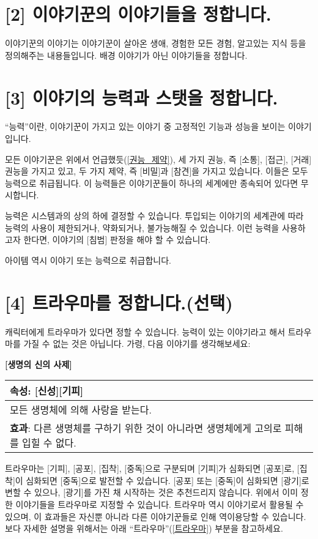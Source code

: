 \documentclass[12pt]{report}
\newenvironment{story}[2]
{\begin{center}
		{\large \textbf{[#1]}}\\[1ex]
		\begin{tabular}{|p{\textwidth}|}
			\hline
			\textbf{속성}: #2
			\\
			\hline
		}
		{ 
			\\\hline
		\end{tabular}
	\end{center}
}
\begin{document}
	\section*{[2] 이야기꾼의 이야기들을 정합니다.}
	이야기꾼의 이야기는 이야기꾼이 살아온 생애, 경험한 모든 경험, 알고있는 지식 등을 정의해주는 내용들입니다. 배경 이야기가 아닌 이야기들을 정합니다.
	
	\section*{[3] 이야기의 능력과 스탯을 정합니다.}
	“능력”이란, 이야기꾼이 가지고 있는 이야기 중 고정적인 기능과 성능을 보이는 이야기입니다.
	
	모든 이야기꾼은 위에서 언급했듯(\ref{권능_제약}), 세 가지 권능, 즉 [소통], [접근], [거래] 권능을 가지고 있고, 두 가지 제약, 즉 [비밀]과 [참견]을 가지고 있습니다. 이들은 모두 능력으로 취급됩니다. 이 능력들은 이야기꾼들이 하나의 세계에만 종속되어 있다면 무시합니다.
	
	능력은 시스템과의 상의 하에 결정할 수 있습니다. 투입되는 이야기의 세계관에 따라 능력의 사용이 제한되거나, 약화되거나, 불가능해질 수 있습니다. 이런 능력을 사용하고자 한다면, 이야기의 [침범] 판정을 해야 할 수 있습니다.
	
	아이템 역시 이야기 또는 능력으로 취급합니다.
	
	\section*{[4] 트라우마를 정합니다.(선택)}
	캐릭터에게 트라우마가 있다면 정할 수 있습니다. 능력이 있는 이야기라고 해서 트라우마를 가질 수 없는 것은 아닙니다. 가령, 다음 이야기를 생각해보세요:
	
	\begin{story}{생명의 신의 사제}{[신성][기피]}
		모든 생명체에 의해 사랑을 받는다.
		\\
		\textbf{효과}: 다른 생명체를 구하기 위한 것이 아니라면 생명체에게 고의로 피해를 입힐 수 없다.
	\end{story}
	
	트라우마는 [기피], [공포], [집착], [중독]으로 구분되며 [기피]가 심화되면 [공포]로, [집착]이 심화되면 [중독]으로 발전할 수 있습니다. [공포] 또는 [중독]이 심화되면 [광기]로 변할 수 있으나, [광기]를 가진 채 시작하는 것은 추천드리지 않습니다. 위에서 이미 정한 이야기들을 트라우마로 지정할 수 있습니다. 트라우마 역시 이야기로서 활용될 수 있으며, 이 효과들은 자신뿐 아니라 다른 이야기꾼들로 인해 역이용당할 수 있습니다. 보다 자세한 설명을 위해서는 아래 “트라우마”(\ref{트라우마}) 부분을 참고하세요.
	
\end{document}
